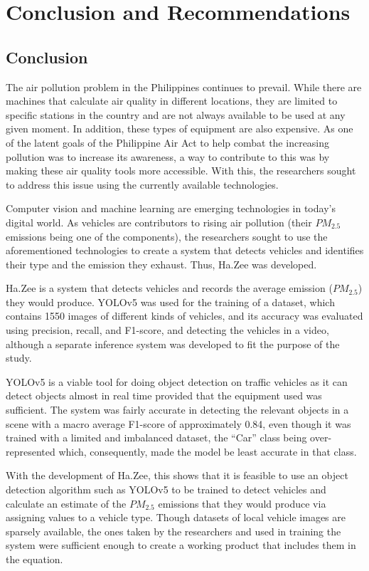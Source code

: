\chapter{Conclusion and Recommendations}

\section{Conclusion}
The air pollution problem in the Philippines continues to prevail. While there are machines that calculate air quality in different locations, they are limited to specific stations in the country and are not always available to be used at any given moment. In addition, these types of equipment are also expensive. As one of the latent goals of the Philippine Air Act to help combat the increasing pollution was to increase its awareness, a way to contribute to this was by making these air quality tools more accessible. With this, the researchers sought to address this issue using the currently available technologies.

Computer vision and machine learning are emerging technologies in today’s digital world. As vehicles are contributors to rising air pollution (their $PM_{2.5}$ emissions being one of the components), the researchers sought to use the aforementioned technologies to create a system that detects vehicles and identifies their type and the emission they exhaust. Thus, Ha.Zee was developed.

Ha.Zee is a system that detects vehicles and records the average emission ($PM_{2.5}$) they would produce. YOLOv5 was used for the training of a dataset, which contains 1550 images of different kinds of vehicles, and its accuracy was evaluated using precision, recall, and F1-score, and detecting the vehicles in a video, although a separate inference system was developed to fit the purpose of the study. 

YOLOv5 is a viable tool for doing object detection on traffic vehicles as it can detect objects almost in real time provided that the equipment used was sufficient. The system was fairly accurate in detecting the relevant objects in a scene with a macro average F1-score of approximately 0.84, even though it was trained with a limited and imbalanced dataset, the “Car” class being over-represented which, consequently, made the model be least accurate in that class.

With the development of Ha.Zee, this shows that it is feasible to use an object detection algorithm such as YOLOv5 to be trained to detect vehicles and calculate an estimate of the $PM_{2.5}$ emissions that they would produce via assigning values to a vehicle type. Though datasets of local vehicle images are sparsely available, the ones taken by the researchers and used in training the system were sufficient enough to create a working product that includes them in the equation.

